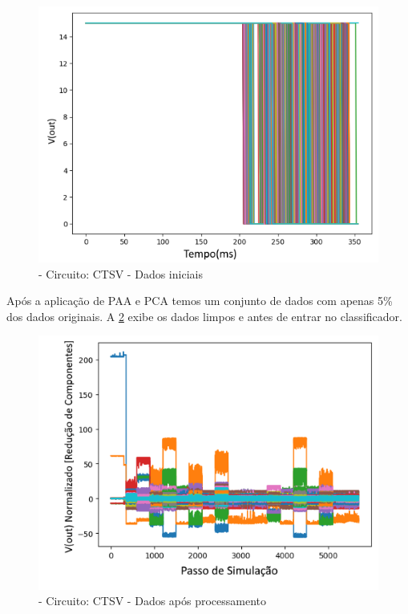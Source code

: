   \begin{figure}[H]
        \begin{center}
        \includegraphics[width=13cm]{./01_Pre_textuais/ctsv_figs/dadosPreProc_CTSV_mc_+_4bitPRBS_[FALHA]raw.png}
        \caption{\label{fig:dadoCSTVinicial}- Circuito: CTSV - Dados iniciais}
        \end{center}
        \end{figure}
        

Após a aplicação de PAA e PCA temos um conjunto de dados com apenas 5\% dos dados originais. A \ref{fig:pcacstv} exibe os dados limpos e antes de entrar no classificador.

\begin{figure}[H]
        \begin{center}
        \includegraphics[width=13cm]{./01_Pre_textuais/ctsv_figs/PCA_CTSV_mc_+_4bitPRBS_[FALHA]raw.png}
        \caption{\label{fig:pcacstv}- Circuito: CTSV  - Dados após processamento}
        \end{center}
        \end{figure}

